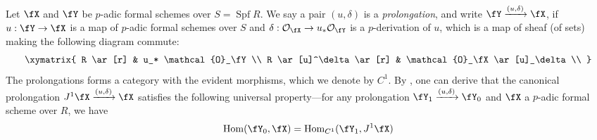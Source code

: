 \documentclass[11pt]{amsart}
\theoremstyle{plain}
\theoremstyle{definition}
\newcommand{\Hom}{\mathrm{Hom}}
\DeclareMathOperator{\Spf}{\mathrm{Spf}}
\newcommand{\sO}{\mathcal{O}}
\begin{document}
Let $\fX$ and $\fY$ be $p$-adic formal schemes over $S=\Spf R$. We say a pair 
$(u,\delta)$ is a {\it prolongation}, and write 
$\fY \xrightarrow{(u,\delta)} \fX$, if $u: \fY \rightarrow \fX$ is a map of $p$-adic formal schemes 
over $S$ and $\delta: \sO_\fX \rightarrow u_*\sO_\fY$ is a 
$p$-derivation of $u$, which is a map of sheaf (of sets) making the following diagram commute: 
	$$
	\xymatrix{
	R \ar[r] &  u_* \sO_\fY \\
	R \ar[u]^\delta \ar[r] &  \sO_\fX \ar[u]_\delta \\
	} 
	$$ 
The prolongations forms a category with the evident morphisms, which we denote by $C^1.$	
By  \cite[Proposition 1.1]{buium:2000}, one can derive that the canonical prolongation $J^1\fX\xrightarrow{(u,\delta)} \fX$ satisfies the following 
universal property---for any prolongation $\fY_1 \xrightarrow{(u,\delta)} \fY_0$ and $\fX$ a $p$-adic formal
scheme over 
$R$, we have
\begin{equation}	
\label{canprouniv}
	\Hom(\fY_0,\fX) = \Hom_{C^1}(\fY_1, J^1\fX)
\end{equation}
\end{document}
